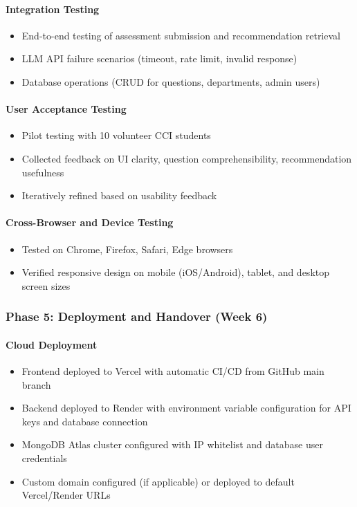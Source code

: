 \documentclass[12pt, a4paper]{article}
\begin{document}
\paragraph{Integration Testing}
\begin{itemize}[leftmargin=1.5em, itemsep=3pt]
    \item End-to-end testing of assessment submission and recommendation retrieval
    \item LLM API failure scenarios (timeout, rate limit, invalid response)
    \item Database operations (CRUD for questions, departments, admin users)
\end{itemize}

\paragraph{User Acceptance Testing}
\begin{itemize}[leftmargin=1.5em, itemsep=3pt]
    \item Pilot testing with 10 volunteer CCI students
    \item Collected feedback on UI clarity, question comprehensibility, recommendation usefulness
    \item Iteratively refined based on usability feedback
\end{itemize}

\paragraph{Cross-Browser and Device Testing}
\begin{itemize}[leftmargin=1.5em, itemsep=3pt]
    \item Tested on Chrome, Firefox, Safari, Edge browsers
    \item Verified responsive design on mobile (iOS/Android), tablet, and desktop screen sizes
\end{itemize}

\subsubsection*{Phase 5: Deployment and Handover (Week 6)}

\paragraph{Cloud Deployment}
\begin{itemize}[leftmargin=1.5em, itemsep=3pt]
    \item Frontend deployed to Vercel with automatic CI/CD from GitHub main branch
    \item Backend deployed to Render with environment variable configuration for API keys and database connection
    \item MongoDB Atlas cluster configured with IP whitelist and database user credentials
    \item Custom domain configured (if applicable) or deployed to default Vercel/Render URLs
\end{itemize}
\end{document}
